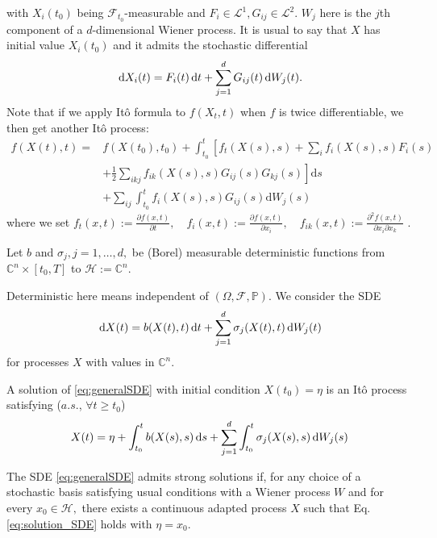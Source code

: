  with $X_{i}\left(t_{0}\right)$ being $\mathcal{F}_{t_{0}}$-measurable and $F_{i} \in \mathcal{L}^{1}, G_{i j} \in \mathcal{L}^{2}$. $ W_j $ here is the $ j $th component of a $ d $-dimensional Wiener process. It is usual to say that $X$ has initial value $X_{i}\left(t_{0}\right)$ and it admits the stochastic differential \[ \,\mathrm{d} X_{i}(t)=F_{i}(t) \,\mathrm{d} t+\sum_{j=1}^{d} G_{i j}(t) \,\mathrm{d} W_{j}(t) .\]
 Note that if we apply Itô formula to $ f(X_t,t) $ when $ f $ is twice differentiable, we then get another Itô process:
\[ \begin{aligned} f(X(t), t)=& f\left(X\left(t_{0}\right), t_{0}\right)+\int_{t_{0}}^{t}\left[f_{t}(X(s), s)+\sum_{i} f_{i}(X(s), s) F_{i}(s)\right.\\ &\left.+\frac{1}{2} \sum_{i k j} f_{i k}(X(s), s) G_{i j}(s) G_{k j}(s)\right] \mathrm{d} s \\ &+\sum_{i j} \int_{t_{0}}^{t} f_{i}(X(s), s) G_{i j}(s) \mathrm{d} W_{j}(s) \end{aligned} \]
where we set $f_{t}(x, t):=\frac{\partial f(x, t)}{\partial t}, \quad f_{i}(x, t):=\frac{\partial f(x, t)}{\partial x_{i}}, \quad f_{i k}(x, t):=\frac{\partial^{2} f(x, t)}{\partial x_{i} \partial x_{k}}$ .
\begin{hypothesis}\label{hypo:SDEclass}
	Let $b$ and $\sigma_{j}, j=1, \ldots, d,$ be (Borel) measurable deterministic functions from $\mathbb{C}^{n} \times\left[t_{0}, T\right]$ to $ \mathcal{H} := \mathbb{C}^{n}$.
\end{hypothesis}
Deterministic here means independent of $(\Omega, \mathcal{F}, \mathbb{P})$. We consider the SDE
\begin{equation}\label{eq:generalSDE}
\,\mathrm{d} X(t)=b(X(t), t) \,\mathrm{d} t+\sum_{j=1}^{d} \sigma_{j}(X(t), t) \,\mathrm{d} W_{j}(t)
\end{equation}
for processes $  X  $ with values in $ \mathbb{C}^{n}$.

A solution of \eqref{eq:generalSDE} with initial condition $X\left(t_{0}\right)=\eta$ is an Itô process satisfying ($a.s.$, $ \forall t \geq t_{0}$)
\begin{equation}\label{eq:solution_SDE}
X(t)=\eta+\int_{t_{0}}^{t} b(X(s), s) \,\mathrm{d} s+\sum_{j=1}^{d} \int_{t_{0}}^{t} \sigma_{j}(X(s), s) \,\mathrm{d} W_{j}(s)
\end{equation}


\begin{definition}\label{def:strong_solution_SDE}
	The SDE \eqref{eq:generalSDE} admits strong solutions if, for any choice of a stochastic basis satisfying usual conditions with a Wiener process $W$ and for every $x_{0} \in \mathcal{H},$ there exists a continuous adapted process $X$ such that Eq. \eqref{eq:solution_SDE} holds with $\eta=x_{0}$.
\end{definition}

